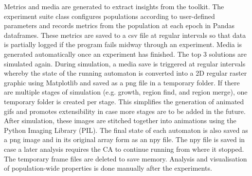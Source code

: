 Metrics and media are generated to extract insights from the toolkit. The experiment suite class configures populations according to user-defined parameters and records metrics from the population at each epoch in Pandas dataframes. These metrics are saved to a csv file at regular intervals so that data is partially logged if the program fails midway through an experiment. Media is generated automatically once an experiment has finished. The top 3 solutions are simulated again. During simulation, a media save is triggered at regular intervals whereby the state of the running automaton is converted into a 2D regular raster graphic using Matplotlib and saved as a png file in a temporary folder. If there are multiple stages of simulation (e.g. growth, region find, and region merge), one temporary folder is created per stage. This simplifies the generation of animated gifs and promotes extensibility in case more stages are to be added in the future. After simulation, these images are stitched together into animations using the Python Imaging Library (PIL). The final state of each automaton is also saved as a png image and in its original array form as an npy file. The npy file is saved in case a later analysis requires the CA to continue running from where it stopped. The temporary frame files are deleted to save memory. Analysis and visualisation of population-wide properties is done manually after the experiments.


